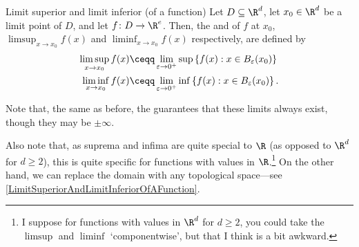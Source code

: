 \begin{dfn}{Limit superior and limit inferior (of a function)}{}
Let $D\subseteq \R ^d$, let $x_0\in \R ^d$ be a limit point of $D$, and let $f\colon D\rightarrow \R ^e$.  Then, the  and  of $f$ at $x_0$, $\limsup _{x\to x_0}f(x)$ and $\liminf _{x\to x_0}f(x)$ respectively, are defined by
\begin{subequations}
\begin{align*}
\limsup _{x\to x_0}f(x) & \ceqq \lim _{\varepsilon \to 0^+}\sup \left\{ f(x):x\in B_{\varepsilon}(x_0)\right\} \\
\liminf _{x\to x_0}f(x)& \ceqq \lim _{\varepsilon \to 0^+}\inf \left\{ f(x):x\in B_{\varepsilon}(x_0)\right\} .
\end{align*}
\end{subequations}
\begin{rmk}
Note that, the same as before, the  guarantees that these limits always exist, though they may be $\pm \infty$.
\end{rmk}
\begin{rmk}
Also note that, as suprema and infima are quite special to $\R$ (as opposed to $\R ^d$ for $d\geq 2$), this is quite specific for functions with values in $\R$.\footnote{I suppose for functions with values in $\R ^d$ for $d\geq 2$, you could take the $\limsup$ and $\liminf$ `componentwise', but that I think is a bit awkward.}  On the other hand, we can replace the domain with any topological space---see \cref{LimitSuperiorAndLimitInferiorOfAFunction}.
\end{rmk}
\end{dfn}

